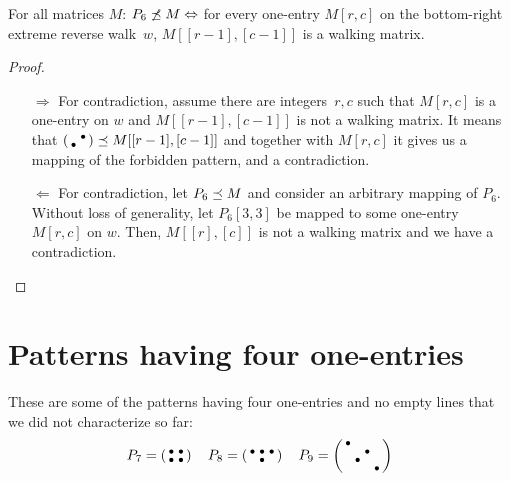 \begin{prop}
For all matrices $M$: $P_6\not\preceq M\Leftrightarrow$ for every one-entry $M[r,c]$ on the bottom-right extreme reverse walk~$w$, $M[[r-1],[c-1]]$ is a walking matrix.
\end{prop}
\begin{proof}
\begin{itemize}
	\item[$\Rightarrow$] For contradiction, assume there are integers~$r,c$ such that $M[r,c]$ is a one-entry on $w$ and $M[[r-1],[c-1]]$ is not a walking matrix. It means that $\left(\begin{smallmatrix} &\bullet\\\bullet& \end{smallmatrix}\right)\preceq M[[r-1],[c-1]]$ and together with $M[r,c]$ it gives us a mapping of the forbidden pattern, and a contradiction.
	\item[$\Leftarrow$] For contradiction, let $P_6\preceq M$ and consider an arbitrary mapping of $P_6$. Without loss of generality, let $P_6[3,3]$ be mapped to some one-entry~$M[r,c]$ on $w$. Then, $M[[r],[c]]$ is not a walking matrix and we have a contradiction. \qedhere
\end{itemize}
\end{proof}

\section{Patterns having four one-entries}
\label{sec:4ones}
These are some of the patterns having four one-entries and no empty lines that we did not characterize so far:
$$P_7=\smm{\bullet&\bullet\\\bullet&\bullet}\ \ 
\ P_8=\smm{\bullet&\bullet&\bullet\\ &\bullet& }\ \ 
\ P_9=\smm{\bullet& & & \\ & &\bullet& \\ &\bullet& & \\ & & &\bullet}$$


